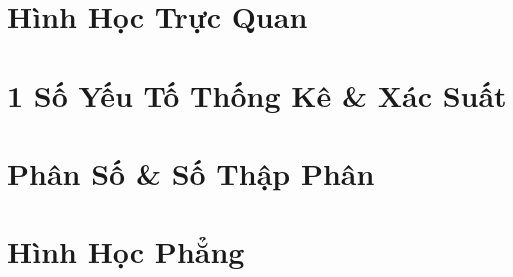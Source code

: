 \documentclass{article}
\numberwithin{equation}{section}
\begin{document}

\section{Hình Học Trực Quan}


\section{1 Số Yếu Tố Thống Kê \& Xác Suất}


\section{Phân Số \& Số Thập Phân}


\section{Hình Học Phẳng}


\printbibliography[heading=bibintoc]
	
\end{document}
